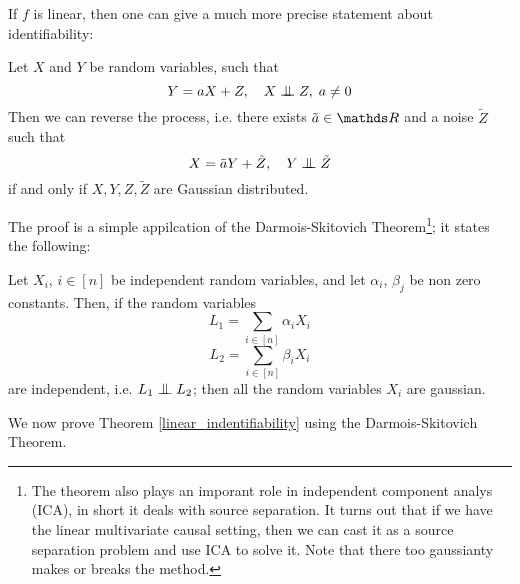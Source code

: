 If $f$ is linear, then one can give a much more precise statement about identifiability:

\begin{theorem} Let $X$ and $Y$ be random variables, such that
$$
    Y = aX + Z, \quad X \bigCI Z, \; a \neq 0
$$
Then we can reverse the process, i.e. there exists $\tilde{a} \in \R$ and a noise $\tilde{Z}$ such that
$$
    X = \tilde{a}Y + \tilde{Z}, \quad Y \bigCI \tilde{Z}
$$
if and only if $X, Y, Z, \tilde{Z}$ are Gaussian distributed. 
\label{linear_indentifiability}
\end{theorem}

The proof is a simple appilcation of the Darmois-Skitovich Theorem\footnote{ The theorem also plays an imporant role
in independent component analys (ICA), in short it deals with source separation. It turns out that if we have the 
linear multivariate causal setting, then we can cast it as a source separation problem and use ICA to solve it. 
Note that there too gaussianty makes or breaks the method.}; it states the following:

\begin{theorem} Let $X_i$, $i \in [n]$ be independent random variables, and let
    $\alpha_i$, $\beta_j$ be non zero constants. Then, if the random variables
    $$ 
        L_1 = \sum_{i \in [n]} \alpha_i X_i
    $$
    $$ 
        L_2 = \sum_{i \in [n]} \beta_i X_i
    $$
    are independent, i.e. $L_1 \bigCI L_2$; then all the random variables $X_i$ are gaussian. 
\end{theorem}

We now prove Theorem \ref{linear_indentifiability} using the Darmois-Skitovich Theorem.

